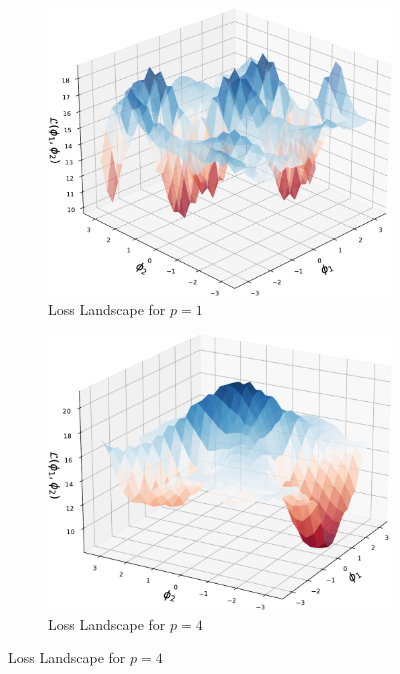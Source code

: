 \documentclass[%
 reprint,
 amsmath,
 amssymb,
 showkeys,
 pra,
 floatfix,
]{revtex4-2}
\begin{document}
\begin{figure}[htp]
    \centering
    \begin{subfigure}[b]{0.32\linewidth}
        \includegraphics[width=\textwidth]{images/loss_landscape_p1.pdf}
        \caption{Loss Landscape for $p=1$\label{fig:loss-p1}}
    \end{subfigure}
    \begin{subfigure}[b]{0.32\linewidth}
        \includegraphics[width=\textwidth]{images/loss_landscape_p2.pdf}
        \caption{Loss Landscape for $p=4$\label{fig:loss-p4}}
    \end{subfigure}

\end{figure}
\end{document}
